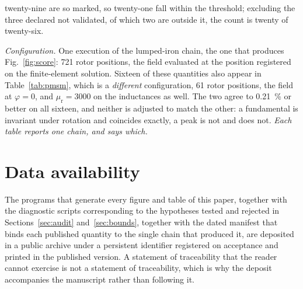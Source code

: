 \documentclass[10pt,a4paper,twocolumn]{article}
\theoremstyle{plain}
\theoremstyle{remark}
\begin{document}
\begin{table}[!t]
\begin{threeparttable}
\begin{tablenotes}[flushleft]
twenty-nine are so marked, so twenty-one fall within the threshold;
excluding the three declared not validated, of which two are outside it,
the count is twenty of twenty-six.
\item \emph{Configuration.} One execution of the lumped-iron chain, the
one that produces Fig.~\ref{fig:score}: \num{721} rotor positions, the
field evaluated at the position registered on the finite-element
solution. Sixteen of these quantities also appear in
Table~\ref{tab:pmsm}, which is a \emph{different} configuration, \num{61}
rotor positions, the field at $\varphi=0$, and
$\mu_{\mathrm{r}}=\num{3000}$ on the inductances as well. The two agree
to \SI{0.21}{\percent} or better on all sixteen, and neither is adjusted
to match the other: a fundamental is invariant under rotation and
coincides exactly, a peak is not and does not. \emph{Each table reports
one chain, and says which.}
\end{tablenotes}
\end{threeparttable}
\caption{The twenty-nine quantities behind Fig.~\ref{fig:score}, with the
deviation of each from the two-dimensional finite-element reference.}
\label{tab:scorecard}
\end{table}


\section*{Data availability}
The programs that generate every figure and table of this paper,
together with the diagnostic scripts corresponding to the hypotheses
tested and rejected in Sections~\ref{sec:audit} and~\ref{sec:bounds},
together with the dated manifest that binds each published quantity to
the single chain that produced it, are deposited in a public archive
under a persistent identifier registered on acceptance and printed in
the published version. A statement of traceability
that the reader cannot exercise is not a statement of traceability,
which is why the deposit accompanies the manuscript rather than
following it.



\end{document}
